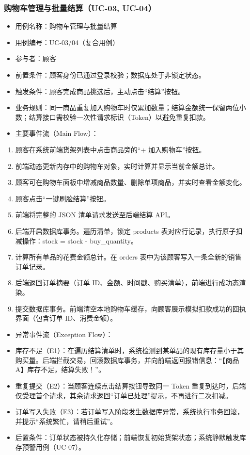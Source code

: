 \subsubsection{购物车管理与批量结算（UC-03, UC-04）}
\begin{itemize}[leftmargin=2em]
  \item 用例名称：购物车管理与批量结算
  \item 用例编号：UC-03/04（复合用例）
  \item 参与者：顾客
  \item 前置条件：顾客身份已通过登录校验；数据库处于非锁定状态。
  \item 触发条件：顾客完成商品挑选后，主动点击“结算”按钮。
  \item 业务规则：同一商品重复加入购物车时仅累加数量；结算金额统一保留两位小数；结算接口需校验一次性请求标识（Token）以避免重复扣款。
  \item 主要事件流（Main Flow）：
\end{itemize}
\begin{enumerate}[leftmargin=2.6em]
  \item 顾客在系统前端货架列表中点击商品旁的“+ 加入购物车”按钮。
  \item 前端动态更新内存中的购物车对象，实时计算并显示当前金额总计。
  \item 顾客可在购物车面板中增减商品数量、删除单项商品，并实时查看金额变化。
  \item 顾客点击“一键刷脸结算”按钮。
  \item 前端将完整的 JSON 清单请求发送至后端结算 API。
  \item 后端开启数据库事务。遍历清单，锁定 products 表对应行记录，执行原子扣减操作：stock = stock - buy\_quantity。
  \item 计算所有单品的花费金额总计。在 orders 表中为该顾客写入一条全新的销售订单记录。
  \item 后端返回订单摘要（订单 ID、金额、时间戳、购买清单），前端进行成功态渲染。
  \item 提交数据库事务。前端清空本地购物车缓存，向顾客展示模拟扣款成功的回执界面（包含订单 ID、消费金额）。
\end{enumerate}

\begin{itemize}[leftmargin=2em]
  \item 异常事件流（Exception Flow）：
  \item 库存不足（E1）：在遍历结算清单时，系统检测到某单品的现有库存量小于其购买量。后端拦截交易，回滚数据库事务，并向前端返回报错信息：“【商品 A】库存不足，结算失败！”。
  \item 重复提交（E2）：当顾客连续点击结算按钮导致同一 Token 重复到达时，后端仅受理首个请求，其余请求返回“订单已处理”提示，不再进行二次扣减。
  \item 订单写入失败（E3）：若订单写入阶段发生数据库异常，系统执行事务回滚，并提示“系统繁忙，请稍后重试”。
  \item 后置条件：订单状态被持久化存储；前端恢复初始货架状态；系统静默触发库存预警用例（UC-07）。
\end{itemize}

